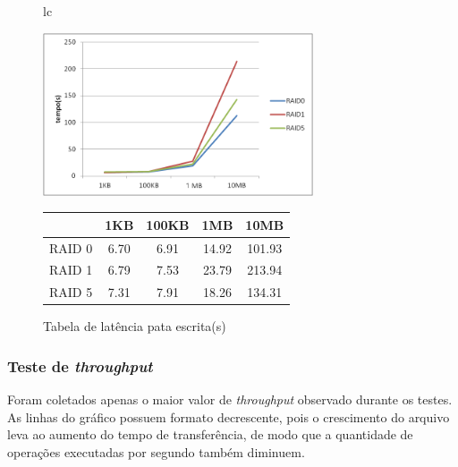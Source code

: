 	\begin{figure}[h]
		\begin{tabular}{lc}
			\begin{minipage}{.50\textwidth}
				\begin{center}
					
					\includegraphics[clip,width=8.0cm]{images/resultados/latencia_escrita.png}
					\caption{Gráfico de latência pata escrita}
					\label{fig:latencia_e}
					
				\end{center}
				
			\end{minipage}
			
			\begin{minipage}{.5\textwidth}
				\makeatletter
				\def\@captype{table}
				\makeatother
				\caption{Tabela de latência pata escrita(s)}
				\label{tab:latencia_e}
				\begin{center}
					\begin{tabular}{|c|c|c|c|c|} \hline
								& 1KB  & 100KB & 1MB   & 10MB \\ \hline
						RAID 0	& 6.70 & 6.91 & 14.92 & 101.93\\ \hline
						RAID 1	& 6.79 & 7.53 & 23.79 & 213.94\\ \hline
						RAID 5	& 7.31 & 7.91 & 18.26 & 134.31\\ \hline
						
					\end{tabular}
					
				\end{center}
			\end{minipage}
		\end{tabular}
	\end{figure}
	
	\subsubsection{Teste de \textit{throughput}}
	Foram coletados apenas o maior valor de \textit{throughput} observado durante os testes. As linhas do gráfico possuem formato decrescente, pois o crescimento do arquivo leva ao aumento do tempo de transferência, de modo que a quantidade de operações executadas por segundo também diminuem.
	\\
	 
